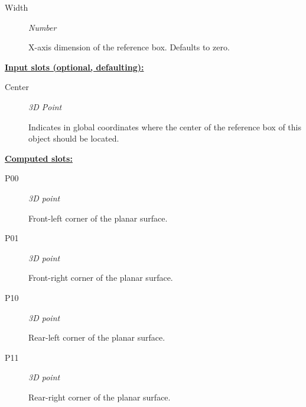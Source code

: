 \documentclass [11pt]{book}
\begin{document}
\begin{itemize}
\begin{description}
\item [Width]
\emph{Number}

 X-axis dimension of the reference box. Defaults to zero.




\end{description}






\textbf{
\underline{Input slots (optional, defaulting):}}

\begin{description}

\item [Center]
\emph{3D Point}

 Indicates in global coordinates where the center of the reference
box of this object should be located.




\end{description}






\textbf{
\underline{Computed slots:}}

\begin{description}

\item [P00]
\emph{3D point}

 Front-left  corner of the planar surface.




\item [P01]
\emph{3D point}

 Front-right corner of the planar surface.




\item [P10]
\emph{3D point}

 Rear-left  corner of the planar surface.




\item [P11]
\emph{3D point}

 Rear-right corner of the planar surface.




\end{description}








\end{itemize}
\end{document}
